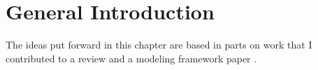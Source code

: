 \chapter{General Introduction}
\label{chapter:introduction}
The ideas put forward in this chapter are based in parts on work that I contributed to a review \citep[P2]{Mueller-Hansen2017} and a modeling framework paper \citep[P3]{Donges2018}.




